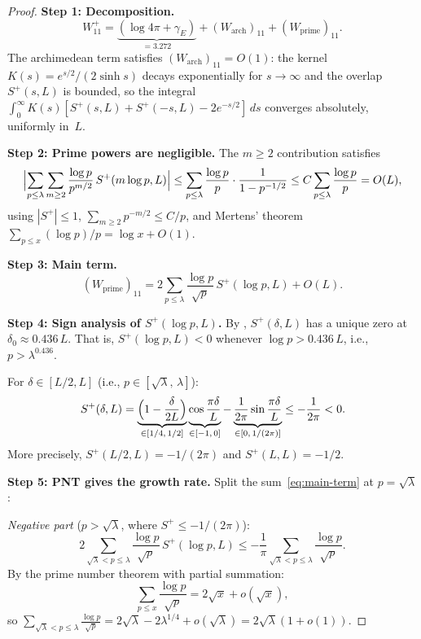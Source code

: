 \documentclass[12pt,a4paper]{article}
\theoremstyle{definition}
\theoremstyle{remark}
\begin{document}
\begin{proof}
\textbf{Step 1: Decomposition.}
\[
  W_{11}^+ = \underbrace{(\log 4\pi + \gamma_E)}_{= 3.272} + (W_{\mathrm{arch}})_{11} + (W_{\mathrm{prime}})_{11}.
\]
The archimedean term satisfies $(W_{\mathrm{arch}})_{11} = O(1)$: the kernel $K(s) = e^{s/2}/(2\sinh s)$ decays exponentially for $s \to \infty$ and the overlap $S^+(s, L)$ is bounded, so the integral $\int_0^{\infty} K(s)[S^+(s,L) + S^+(-s,L) - 2e^{-s/2}]\,ds$ converges absolutely, uniformly in~$L$.

\medskip\noindent\textbf{Step 2: Prime powers are negligible.}
The $m \geq 2$ contribution satisfies
\[
  \Bigl|\sum_{p \leq \lambda}\sum_{m \geq 2} \frac{\log p}{p^{m/2}}\,S^+(m\log p, L)\Bigr|
  \leq \sum_{p \leq \lambda} \frac{\log p}{p}\cdot\frac{1}{1 - p^{-1/2}}
  \leq C\sum_{p \leq \lambda}\frac{\log p}{p} = O(L),
\]
using $|S^+| \leq 1$, $\sum_{m \geq 2} p^{-m/2} \leq C/p$, and Mertens' theorem $\sum_{p \leq x} (\log p)/p = \log x + O(1)$.

\medskip\noindent\textbf{Step 3: Main term.}
\begin{equation}
\label{eq:main-term}
  (W_{\mathrm{prime}})_{11} = 2\sum_{p \leq \lambda}\frac{\log p}{\sqrt{p}}\,S^+(\log p, L) + O(L).
\end{equation}

\medskip\noindent\textbf{Step 4: Sign analysis of $S^+(\log p, L)$.}
By , $S^+(\delta, L)$ has a unique zero at $\delta_0 \approx 0.436\,L$. That is, $S^+(\log p, L) < 0$ whenever $\log p > 0.436\,L$, i.e., $p > \lambda^{0.436}$.

For $\delta \in [L/2, L]$ (i.e., $p \in [\sqrt{\lambda},\,\lambda]$):
\[
  S^+(\delta, L) = \underbrace{\Bigl(1 - \frac{\delta}{2L}\Bigr)}_{\in [1/4,\,1/2]}
  \underbrace{\cos\frac{\pi\delta}{L}}_{\in [-1,\,0]}
  - \underbrace{\frac{1}{2\pi}\sin\frac{\pi\delta}{L}}_{\in [0,\,1/(2\pi)]}
  \leq -\frac{1}{2\pi} < 0.
\]
More precisely, $S^+(L/2, L) = -1/(2\pi)$ and $S^+(L, L) = -1/2$.

\medskip\noindent\textbf{Step 5: PNT gives the growth rate.}
Split the sum~\eqref{eq:main-term} at $p = \sqrt{\lambda}$:

\emph{Negative part} ($p > \sqrt{\lambda}$, where $S^+ \leq -1/(2\pi)$):
\[
  2\sum_{\sqrt{\lambda} < p \leq \lambda}\frac{\log p}{\sqrt{p}}\,S^+(\log p, L)
  \leq -\frac{1}{\pi}\sum_{\sqrt{\lambda} < p \leq \lambda}\frac{\log p}{\sqrt{p}}.
\]
By the prime number theorem with partial summation:
\[
  \sum_{p \leq x}\frac{\log p}{\sqrt{p}} = 2\sqrt{x} + o(\sqrt{x}),
\]
so $\displaystyle\sum_{\sqrt{\lambda} < p \leq \lambda}\frac{\log p}{\sqrt{p}} = 2\sqrt{\lambda} - 2\lambda^{1/4} + o(\sqrt{\lambda}) = 2\sqrt{\lambda}(1 + o(1))$.


\end{proof}
\end{document}
